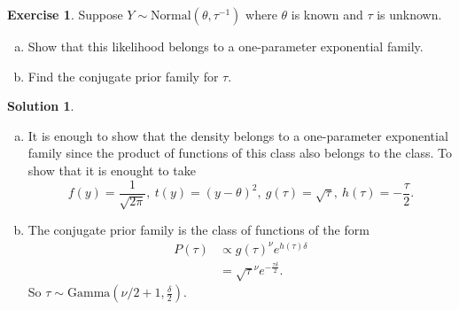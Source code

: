 \documentclass{article}
\theoremstyle{plain}
\theoremstyle{definition}
\newtheorem{exercise}{Exercise}
\newtheorem*{sol*}{Solution}
\begin{document}
\begin{exercise}
Suppose $Y \sim \mathrm{Normal}(θ, τ^{-1})$ where $θ$ is known and $τ$ is unknown.
\begin{enumerate}[(a)]
\item Show that this likelihood belongs to a one-parameter exponential
family.
\item Find the conjugate prior family for $τ$.
\end{enumerate}
\end{exercise}
\begin{sol*}\
\begin{enumerate}[(a)]
\item It is enough to show that the density belongs to a one-parameter exponential family since the product of functions of this class also belongs to the class. To show that it is enought to take
\[f(y) = \frac{1}{\sqrt{2\pi}},\ t(y)=(y-\theta)^2,\ g(\tau)=\sqrt{\tau},\ h(\tau)=-\frac{\tau}{2}.\]
\item The conjugate prior family is the class of functions of the form
\begin{align*}
P(\tau)& \propto g(\tau)^\nu e^{h(\tau)\delta}\\
& = \sqrt{\tau}^\nu e^{-\frac{\tau\delta}{2}}.
\end{align*}
So $\tau\sim\mathrm{Gamma}(\nu/2 +1, \frac{\delta}{2})$.
\end{enumerate}
\end{sol*}
\end{document}
